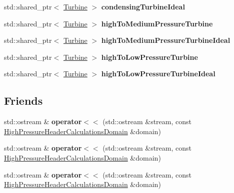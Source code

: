 \begin{DoxyCompactItemize}
std\+::shared\+\_\+ptr$<$ \hyperlink{class_turbine}{Turbine} $>$ {\bfseries condensing\+Turbine\+Ideal}
\item 
\mbox{\label{class_high_pressure_header_calculations_domain_a015436f27c22b82e8c703f133187a45a}} 
std\+::shared\+\_\+ptr$<$ \hyperlink{class_turbine}{Turbine} $>$ {\bfseries high\+To\+Medium\+Pressure\+Turbine}
\item 
\mbox{\label{class_high_pressure_header_calculations_domain_a9cbe2587b474dcd026da2bc06744737c}} 
std\+::shared\+\_\+ptr$<$ \hyperlink{class_turbine}{Turbine} $>$ {\bfseries high\+To\+Medium\+Pressure\+Turbine\+Ideal}
\item 
\mbox{\label{class_high_pressure_header_calculations_domain_a823ed01d4836445fcb66f0581a399666}} 
std\+::shared\+\_\+ptr$<$ \hyperlink{class_turbine}{Turbine} $>$ {\bfseries high\+To\+Low\+Pressure\+Turbine}
\item 
\mbox{\label{class_high_pressure_header_calculations_domain_a8ef1396844d4110a1ed803684b1e1749}} 
std\+::shared\+\_\+ptr$<$ \hyperlink{class_turbine}{Turbine} $>$ {\bfseries high\+To\+Low\+Pressure\+Turbine\+Ideal}
\end{DoxyCompactItemize}
\subsection*{Friends}
\begin{DoxyCompactItemize}
\item 
\mbox{\label{class_high_pressure_header_calculations_domain_a29da324ef3ed79c222c379dc790e9705}} 
std\+::ostream \& {\bfseries operator$<$$<$} (std\+::ostream \&stream, const \hyperlink{class_high_pressure_header_calculations_domain}{High\+Pressure\+Header\+Calculations\+Domain} \&domain)
\item 
\mbox{\label{class_high_pressure_header_calculations_domain_a29da324ef3ed79c222c379dc790e9705}} 
std\+::ostream \& {\bfseries operator$<$$<$} (std\+::ostream \&stream, const \hyperlink{class_high_pressure_header_calculations_domain}{High\+Pressure\+Header\+Calculations\+Domain} \&domain)
\item 
\mbox{\label{class_high_pressure_header_calculations_domain_a29da324ef3ed79c222c379dc790e9705}} 
std\+::ostream \& {\bfseries operator$<$$<$} (std\+::ostream \&stream, const \hyperlink{class_high_pressure_header_calculations_domain}{High\+Pressure\+Header\+Calculations\+Domain} \&domain)
\end{DoxyCompactItemize}


